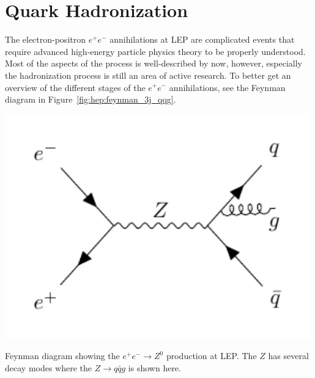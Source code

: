  

\FloatBarrier
\section{Quark Hadronization}
\label{sec:hep:quark_hadronization}

The electron-positron $e^+ e^-$ annihilations at LEP are complicated events that require advanced high-energy particle physics theory to be properly understood. Most of the aspects of the process is well-described by now, however, especially the hadronization process is still an area of active research. To better get an overview of the different stages of the $e^+e^-$ annihilations, see the Feynman diagram in Figure~\ref{fig:hep:feynman_3j_qqg}. 

\begin{marginfigure}
  \centerfloat
  \includegraphics[width=0.99\textwidth, trim=10 10 10 10, clip]{figures/feynman_diagrams/eeZqqg.pdf}
  \caption[Feynman Diagram for the Jet Production at LEP]{Feynman diagram showing the $e^+ e^- \rightarrow Z^0$ production at LEP. The $Z$ has several decay modes where the $Z \rightarrow q\bar{q}g$ is shown here.}
  \label{fig:hep:feynman_3j_qqg}
\end{marginfigure}

